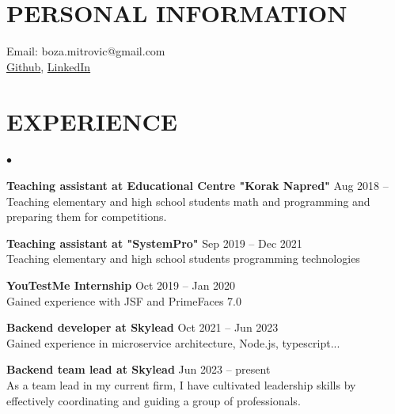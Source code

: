 \documentclass[margin,center]{res}
\newenvironment{list2}{
  \begin{list}{$\bullet$}{%
      \setlength{\itemsep}{0in}
      \setlength{\parsep}{0in} \setlength{\parskip}{0in}
      \setlength{\topsep}{0in} \setlength{\partopsep}{0in}
      \setlength{\leftmargin}{0.2in}}}{\end{list}}
\begin{document}

\begin{figure}
\hfill{}\vspace*{-1cm}
\end{figure}

\begin{resume}
\section{PERSONAL INFORMATION}
{ Email:    }   boza.mitrovic@gmail.com  \\ 
\href{https://github.com/AizenAngel}{Github}, \href{https://www.linkedin.com/in/bo%C5%BEidar-mitrovi%C4%87-1a379991/}{LinkedIn}

\section{EXPERIENCE} 
\begin{list2}
  \item{\bf Teaching assistant at Educational Centre "Korak Napred"}  \hfill Aug 2018 --\\
    Teaching elementary and high school students math and programming and preparing them for competitions.
  \item{\bf Teaching assistant at "SystemPro"}  \hfill Sep 2019 -- Dec 2021\\
    Teaching elementary and high school students programming technologies 
  \item{\bf YouTestMe Internship}  \hfill Oct 2019 -- Jan 2020\\
    Gained experience with JSF and PrimeFaces 7.0 
  \item{\bf Backend developer at Skylead} \hfill Oct 2021 -- Jun 2023\\
    Gained experience in microservice architecture, Node.js, typescript...
  \item{\bf Backend team lead at Skylead} \hfill Jun 2023 -- present\\
    As a team lead in my current firm, I have cultivated leadership skills by effectively coordinating and guiding a group of professionals.
\end{list2}


\end{resume}
\end{document}

